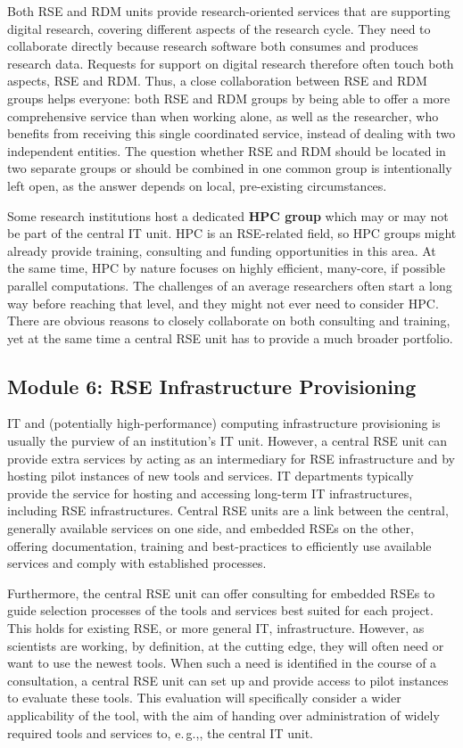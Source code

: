 \documentclass[a4paper]{article}
\newcommand*{\eg}{e.\,g.,\xspace}
\begin{document}
Both RSE and RDM units provide research-oriented services that are supporting digital research, covering different aspects of the research cycle.
They need to collaborate directly because research software both consumes and produces research data.
Requests for support on digital research therefore often touch both aspects, RSE and RDM\@.
Thus, a close collaboration between RSE and RDM groups helps everyone: both RSE and RDM groups by being able to offer a more comprehensive service than when working alone, as well as the researcher, who benefits from receiving this single coordinated service, instead of dealing with two independent entities.
The question whether RSE and RDM should be located in two separate groups or should be combined in one common group is intentionally left open, as the answer depends on local, pre-existing circumstances.

Some research institutions host a dedicated \textbf{HPC group} which may or may not be part of the central IT unit.
HPC is an RSE-related field, so HPC groups might already provide training, consulting and funding opportunities in this area.
At the same time, HPC by nature focuses on highly efficient, many-core, if possible parallel computations.
The challenges of an average researchers often start a long way before reaching that level, and they might not ever need to consider HPC\@.
There are obvious reasons to closely collaborate on both consulting and training, yet at the same time a central RSE unit has to provide a much broader portfolio.

\subsection{Module 6: RSE Infrastructure Provisioning}%
\label{sec:infrastructure}

IT and (potentially high-performance) computing infrastructure provisioning is usually the purview of an institution's IT unit.
However, a central RSE unit can provide extra services by acting as an intermediary for RSE infrastructure and by hosting pilot instances of new tools and services.
IT departments typically provide the service for hosting and accessing long-term IT infrastructures, including RSE infrastructures.
Central RSE units are a link between the central, generally available services on one side,
  and embedded RSEs on the other, offering documentation, training and best-practices to efficiently use available services and comply with established processes.

Furthermore, the central RSE unit can offer consulting for embedded RSEs to guide selection processes of the tools and services best suited for each project.
This holds for existing RSE, or more general IT, infrastructure.
However, as scientists are working, by definition, at the cutting edge, they will often need or want to use the newest tools.
When such a need is identified in the course of a consultation, a central RSE unit can set up and provide access to pilot instances to evaluate these tools.
This evaluation will specifically consider a wider applicability of the tool, with the aim of handing over administration of widely required tools and services to, \eg{}, the central IT unit.
\end{document}
